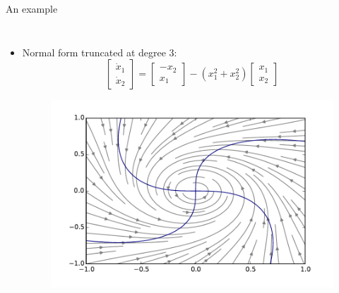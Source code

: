 \documentclass[10pt,T]{beamer}
\begin{document}
\begin{frame}{An example}
\begin{columns}[T,onlytextwidth]
\column{\textwidth}
\begin{itemize}
\item Normal form truncated at degree 3:
  \begin{equation*}
\begin{bmatrix}\dot{x}_1\\\dot{x}_2\end{bmatrix} = \begin{bmatrix}-x_2\\x_1\end{bmatrix}-\left( x_1^2+x_2^2 \right)\begin{bmatrix}x_1\\x_2\end{bmatrix}
  \end{equation*}
\begin{figure}
  \centering
  \includegraphics[keepaspectratio,width=.66\textwidth]{./fig/normal.pdf}
\end{figure}
\end{itemize}
\end{columns}
\end{frame}
\end{document}
